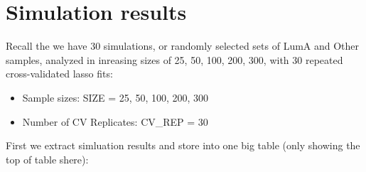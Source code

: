 \documentclass[
]{book}
\begin{document}
\hypertarget{simulation-results-1}{%
\section{Simulation results}\label{simulation-results-1}}

Recall the we have 30 simulations, or randomly selected sets of LumA and Other samples,
analyzed in inreasing sizes of 25, 50, 100, 200, 300, with
30 repeated cross-validated lasso fits:

\begin{itemize}
\item
  Sample sizes: SIZE = 25, 50, 100, 200, 300
\item
  Number of CV Replicates: CV\_REP = 30
\end{itemize}

First we extract simluation results and store into one big table (only showing the top of table shere):
\end{document}

